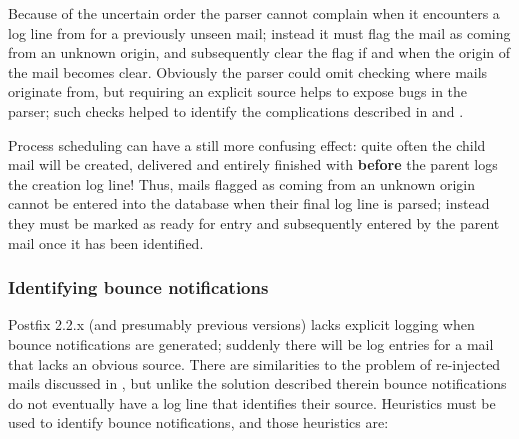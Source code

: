 Because of the uncertain order the parser cannot complain when it
encounters a log line from  for a previously unseen mail;
instead it must flag the mail as coming from an unknown origin, and
subsequently clear the flag if and when the origin of the mail becomes
clear.  Obviously the parser could omit checking where mails originate
from, but requiring an explicit source helps to expose bugs in the parser;
such checks helped to identify the complications described in
 and .

Process scheduling can have a still more confusing effect: quite often the
child mail will be created, delivered and entirely finished with
\textbf{before} the parent logs the creation log line!  Thus, mails flagged
as coming from an unknown origin cannot be entered into the database when
their final log line is parsed; instead they must be marked as ready for
entry and subsequently entered by the parent mail once it has been
identified.

\subsubsection{Identifying bounce notifications}

\label{identifying-bounce-notifications}

Postfix 2.2.x (and presumably previous versions) lacks explicit logging
when bounce notifications are generated; suddenly there will be log entries
for a mail that lacks an obvious source.  There are similarities to the
problem of re-injected mails discussed in , but unlike the solution described therein bounce notifications do
not eventually have a log line that identifies their source.  Heuristics
must be used to identify bounce notifications, and those heuristics are:

